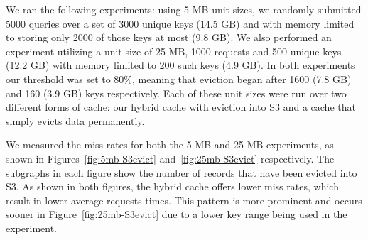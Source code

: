 We ran the following experiments: using 5 MB unit sizes, we randomly submitted
5000 queries over a set of 3000 unique keys (14.5 GB) and with memory limited
to storing only 2000 of those keys at most (9.8 GB). We also performed an
experiment utilizing a unit size of 25 MB, 1000 requests and 500 unique keys
(12.2 GB) with memory limited to 200 such keys (4.9 GB). In both experiments
our threshold was set to 80\%, meaning that eviction began after 1600 (7.8 GB)
and 160 (3.9 GB) keys respectively. Each of these unit sizes were run over two
different forms of cache: our hybrid cache with eviction into S3 and a cache
that simply evicts data permanently.

We measured the miss rates for both the 5 MB and 25 MB experiments, as shown in
Figures~\ref{fig:5mb-S3evict} and~\ref{fig:25mb-S3evict} respectively. The
subgraphs in each figure show the number of records that have been evicted into
S3. As shown in both figures, the hybrid cache offers lower miss rates, which
result in lower average requests times. This pattern is more prominent and
occurs sooner in Figure~\ref{fig:25mb-S3evict} due to a lower key range being
used in the experiment.

